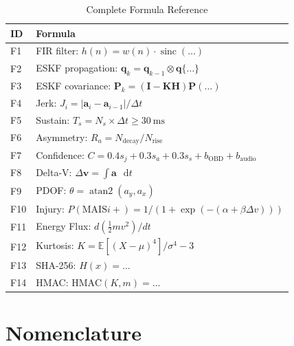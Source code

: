 \documentclass[conference,twocolumn]{IEEEtran}
\newcommand{\E}{\mathbb{E}}
\newcommand{\vect}[1]{\boldsymbol{#1}}
\newcommand{\mat}[1]{\mathbf{#1}}
\newcommand{\diff}{\mathop{}\!\mathrm{d}}
\begin{document}
\begin{table}[h]
\centering
\caption{Complete Formula Reference}
\label{tab:formula-catalog}
\small
\renewcommand{\arraystretch}{1.3}
\begin{tabular}{@{}l l@{}}
\toprule
\textbf{ID} & \textbf{Formula} \\
\midrule
F1  & FIR filter: $h(n) = w(n) \cdot \operatorname{sinc}(\ldots)$ \\
F2  & ESKF propagation: $\vect{q}_k = \vect{q}_{k-1} \otimes \vect{q}\{\ldots\}$ \\
F3  & ESKF covariance: $\mat{P}_k = (\mat{I}-\mat{K}\mat{H})\mat{P}(\ldots)$ \\
F4  & Jerk: $J_i = |\vect{a}_i - \vect{a}_{i-1}| / \Delta t$ \\
F5  & Sustain: $T_s = N_s \times \Delta t \geq \SI{30}{\milli\second}$ \\
F6  & Asymmetry: $R_a = N_{\text{decay}} / N_{\text{rise}}$ \\
F7  & Confidence: $C = 0.4 s_j + 0.3 s_a + 0.3 s_s + b_{\text{OBD}} + b_{\text{audio}}$ \\
F8  & Delta-V: $\Delta \vect{v} = \int \vect{a}\,\diff t$ \\
F9  & PDOF: $\theta = \operatorname{atan2}(a_y, a_x)$ \\
F10 & Injury: $P(\text{MAIS}i+) = 1/(1+\exp(-(\alpha+\beta \Delta v)))$ \\
F11 & Energy Flux: $d(\tfrac{1}{2} m v^2)/dt$ \\
F12 & Kurtosis: $K = \E[(X-\mu)^4]/\sigma^4 - 3$ \\
F13 & SHA-256: $H(x) = \ldots$ \\
F14 & HMAC: $\text{HMAC}(K,m) = \ldots$ \\
\bottomrule
\end{tabular}
\end{table}

\section{Nomenclature}
\label{app:nomenclature}
\end{document}
